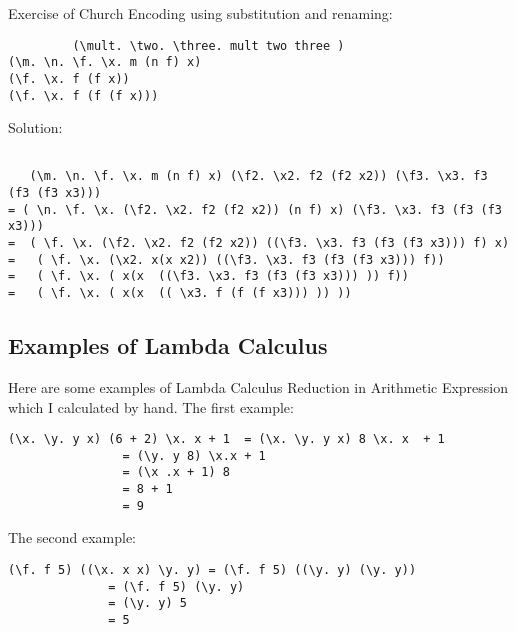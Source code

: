 \documentclass{article}
\begin{document}
Exercise of Church Encoding using substitution and renaming:
\begin{lstlisting}
         (\mult. \two. \three. mult two three )
(\m. \n. \f. \x. m (n f) x)  
(\f. \x. f (f x))
(\f. \x. f (f (f x)))
  \end{lstlisting}
Solution: 
\begin{lstlisting}
    
   (\m. \n. \f. \x. m (n f) x) (\f2. \x2. f2 (f2 x2)) (\f3. \x3. f3 (f3 (f3 x3)))    
= ( \n. \f. \x. (\f2. \x2. f2 (f2 x2)) (n f) x) (\f3. \x3. f3 (f3 (f3 x3)))  
=  ( \f. \x. (\f2. \x2. f2 (f2 x2)) ((\f3. \x3. f3 (f3 (f3 x3))) f) x)
=   ( \f. \x. (\x2. x(x x2)) ((\f3. \x3. f3 (f3 (f3 x3))) f))
=   ( \f. \x. ( x(x  ((\f3. \x3. f3 (f3 (f3 x3))) )) f))
=   ( \f. \x. ( x(x  (( \x3. f (f (f x3))) )) ))

  \end{lstlisting}

\subsection{Examples of Lambda Calculus}
Here are some examples of Lambda Calculus Reduction in Arithmetic Expression which I calculated by hand.
\newline \newline The first example:
\begin{lstlisting}
(\x. \y. y x) (6 + 2) \x. x + 1  = (\x. \y. y x) 8 \x. x  + 1
				= (\y. y 8) \x.x + 1
				= (\x .x + 1) 8
				= 8 + 1
				= 9
\end{lstlisting}
The second example:
\begin{lstlisting}
(\f. f 5) ((\x. x x) \y. y) = (\f. f 5) ((\y. y) (\y. y))
			  = (\f. f 5) (\y. y)
			  = (\y. y) 5
			  = 5
\end{lstlisting}
\end{document}
